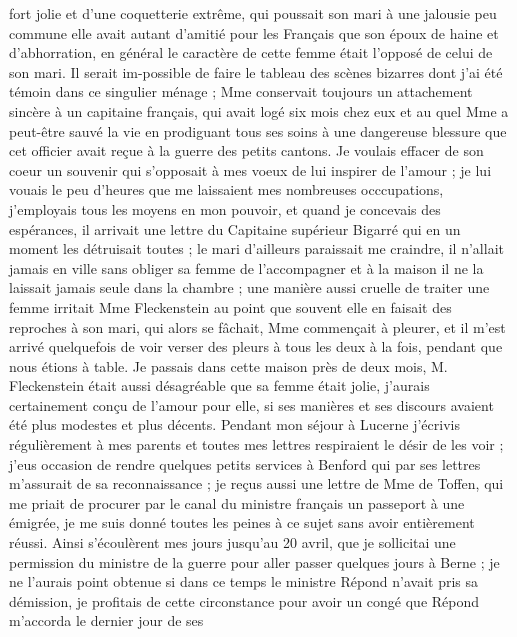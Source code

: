 \documentclass[12pt]{article}
\begin{document}
 fort jolie et d’une coquetterie extrême, qui
poussait son mari à une jalousie peu commune elle avait autant d’amitié pour les Français que son
époux de haine et d’abhorration, en général le caractère de cette femme était l’opposé de celui de
son mari. Il serait im-possible de faire le tableau des scènes bizarres dont j’ai été témoin dans ce
singulier ménage ; Mme conservait toujours un attachement sincère à un capitaine français, qui avait
logé six mois chez eux et au quel Mme a peut-être sauvé la vie en prodiguant tous ses soins à une
dangereuse blessure que cet officier avait reçue à la guerre des petits cantons. Je voulais effacer
de son coeur un souvenir qui s’opposait à mes voeux de lui inspirer de l’amour ; je lui vouais le
peu d’heures que me laissaient mes nombreuses occcupations, j’employais tous les moyens en mon
pouvoir, et quand je concevais des espérances, il arrivait une lettre du Capitaine supérieur Bigarré
qui en un moment les détruisait toutes ; le mari d’ailleurs paraissait me craindre, il n’allait
jamais en ville sans obliger sa femme de l’accompagner et à la maison il ne la laissait jamais seule
dans la chambre ; une manière aussi cruelle de traiter une femme irritait Mme Fleckenstein au point
que souvent elle en faisait des reproches à son mari, qui alors se fâchait, Mme commençait à
pleurer, et il m’est arrivé quelquefois de voir verser des pleurs à tous les deux à la fois, pendant
que nous étions à table. Je passais dans cette maison près de deux mois, M. Fleckenstein était aussi
désagréable que sa femme était jolie, j’aurais certainement conçu de l’amour pour elle, si ses
manières et ses discours avaient été plus modestes et plus décents. Pendant mon séjour à Lucerne
j’écrivis régulièrement à mes parents et toutes mes lettres respiraient le désir de les voir ; j’eus
occasion de rendre quelques petits services à Benford qui par ses lettres m’assurait de sa
reconnaissance ; je reçus aussi une lettre de Mme de Toffen, qui me priait de procurer par le canal
du ministre français un passeport à une émigrée, je me suis donné toutes les peines à ce sujet sans
avoir entièrement réussi. Ainsi s’écoulèrent mes jours jusqu’au 20 avril, que je sollicitai une
permission du ministre de la guerre pour aller passer quelques jours à Berne ; je ne l’aurais point
obtenue si dans ce temps le ministre Répond n’avait pris sa démission, je profitais de cette
circonstance pour avoir un congé que Répond m’accorda le dernier jour de ses
\end{document}
